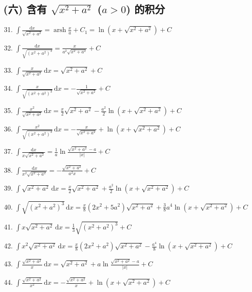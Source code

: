 \subsection*{(六) 含有 $\sqrt{x^2 + a^2}$ ($a > 0$) 的积分}

\begin{enumerate}
    \setcounter{enumi}{30}
    \item $\displaystyle \int \frac{\mathrm{d}x}{\sqrt{x^2 + a^2}} = \operatorname{arsh} \frac{x}{a} + C_1 = \ln \left( x + \sqrt{x^2 + a^2} \right) + C$
    \item $\displaystyle \int \frac{\mathrm{d}x}{\sqrt{(x^2 + a^2)^3}} = \frac{x}{a^2 \sqrt{x^2 + a^2}} + C$
    \item $\displaystyle \int \frac{x}{\sqrt{x^2 + a^2}} \, \mathrm{d}x = \sqrt{x^2 + a^2} + C$
    \item $\displaystyle \int \frac{x}{\sqrt{(x^2 + a^2)^3}} \, \mathrm{d}x = -\frac{1}{\sqrt{x^2 + a^2}} + C$
    \item $\displaystyle \int \frac{x^2}{\sqrt{x^2 + a^2}} \, \mathrm{d}x = \frac{x}{2} \sqrt{x^2 + a^2} - \frac{a^2}{2} \ln \left( x + \sqrt{x^2 + a^2} \right) + C$
    \item $\displaystyle \int \frac{x^2}{\sqrt{(x^2 + a^2)^3}} \, \mathrm{d}x = -\frac{x}{\sqrt{x^2 + a^2}} + \ln \left( x + \sqrt{x^2 + a^2} \right) + C$
    \item $\displaystyle \int \frac{\mathrm{d}x}{x \sqrt{x^2 + a^2}} = \frac{1}{a} \ln \frac{\sqrt{x^2 + a^2} - a}{|x|} + C$
    \item $\displaystyle \int \frac{\mathrm{d}x}{x^2 \sqrt{x^2 + a^2}} = -\frac{\sqrt{x^2 + a^2}}{a^2 x} + C$
    \item $\displaystyle \int \sqrt{x^2 + a^2} \, \mathrm{d}x = \frac{x}{2} \sqrt{x^2 + a^2} + \frac{a^2}{2} \ln \left( x + \sqrt{x^2 + a^2} \right) + C$
    \item $\displaystyle \int \sqrt{(x^2 + a^2)^3} \, \mathrm{d}x = \frac{x}{8} (2x^2 + 5a^2) \sqrt{x^2 + a^2} + \frac{3}{8} a^4 \ln \left( x + \sqrt{x^2 + a^2} \right) + C$
    \item $\displaystyle \int x \sqrt{x^2 + a^2} \, \mathrm{d}x = \frac{1}{3} \sqrt{(x^2 + a^2)^3} + C$
    \item $\displaystyle \int x^2 \sqrt{x^2 + a^2} \, \mathrm{d}x = \frac{x}{8} (2x^2 + a^2) \sqrt{x^2 + a^2} - \frac{a^4}{8} \ln \left( x + \sqrt{x^2 + a^2} \right) + C$
    \item $\displaystyle \int \frac{\sqrt{x^2 + a^2}}{x} \, \mathrm{d}x = \sqrt{x^2 + a^2} + a \ln \frac{\sqrt{x^2 + a^2} - a}{|x|} + C$
    \item $\displaystyle \int \frac{\sqrt{x^2 + a^2}}{x^2} \, \mathrm{d}x = -\frac{\sqrt{x^2 + a^2}}{x} + \ln \left( x + \sqrt{x^2 + a^2} \right) + C$
\end{enumerate}

